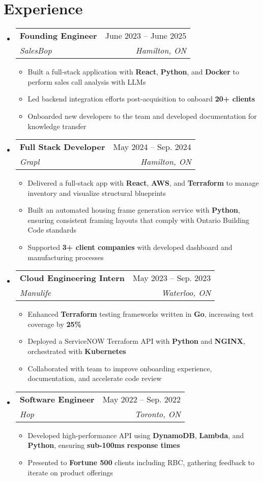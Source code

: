 \documentclass[letterpaper,11pt]{article}
\makeatletter
\newcommand{\resumeItem}[1]{
  \item\small{
    {#1 \vspace{-2pt}}
  }
}
\newcommand{\resumeSubheading}[4]{
  \vspace{-2pt}\item
    \begin{tabular*}{0.97\textwidth}[t]{l@{\extracolsep{\fill}}r}
      \textbf{#1} & #2 \\
      \textit{\small#3} & \textit{\small #4} \\
    \end{tabular*}\vspace{-7pt}
}
\newcommand{\resumeSubHeadingListStart}{\begin{itemize}[leftmargin=0.15in, label={}]}
\newcommand{\resumeSubHeadingListEnd}{\end{itemize}}
\newcommand{\resumeItemListStart}{\begin{itemize}}
\newcommand{\resumeItemListEnd}{\end{itemize}\vspace{-5pt}}
\makeatother
\begin{document}
\section{Experience}
  \resumeSubHeadingListStart

    \resumeSubheading
        {Founding Engineer}{June 2023 -- June 2025}
        {SalesBop}{Hamilton, ON}
        \resumeItemListStart
            \resumeItem{Built a full-stack application with \textbf{React}, \textbf{Python}, and \textbf{Docker} to perform sales call analysis with LLMs}
            \resumeItem{Led backend integration efforts post-acquisition to onboard \textbf{20+ clients}}
            \resumeItem{Onboarded new developers to the team and developed documentation for knowledge transfer}
        \resumeItemListEnd

    \resumeSubheading
        {Full Stack Developer}{May 2024 -- Sep. 2024}
        {Grapl}{Hamilton, ON}
        \resumeItemListStart
           \resumeItem{Delivered a full-stack app with \textbf{React}, \textbf{AWS}, and \textbf{Terraform} to manage inventory and visualize structural blueprints}
           \resumeItem{Built an automated housing frame generation service with \textbf{Python}, ensuring consistent framing layouts that comply with Ontario Building Code standards}
           \resumeItem{Supported \textbf{3+ client companies} with developed dashboard and manufacturing processes}
        \resumeItemListEnd

    \resumeSubheading
        {Cloud Engineering Intern}{May 2023 -- Sep. 2023}
        {Manulife}{Waterloo, ON}
        \resumeItemListStart
            \resumeItem{Enhanced \textbf{Terraform} testing frameworks written in \textbf{Go}, increasing test coverage by \textbf{25\%}}
            \resumeItem{Deployed a ServiceNOW Terraform API with \textbf{Python} and \textbf{NGINX}, orchestrated with \textbf{Kubernetes}}
            \resumeItem{Collaborated with team to improve onboarding experience, documentation, and accelerate code review}
        \resumeItemListEnd
    \resumeSubheading
        {Software Engineer}{May 2022 -- Sep. 2022}
        {Hop}{Toronto, ON}
        \resumeItemListStart
            \resumeItem{Developed high-performance API using \textbf{DynamoDB}, \textbf{Lambda}, and \textbf{Python}, ensuring \textbf{sub-100ms response times}}
            \resumeItem{Presented to \textbf{Fortune 500} clients including RBC, gathering feedback to iterate on product offerings}
        \resumeItemListEnd    

  \resumeSubHeadingListEnd
\end{document}
